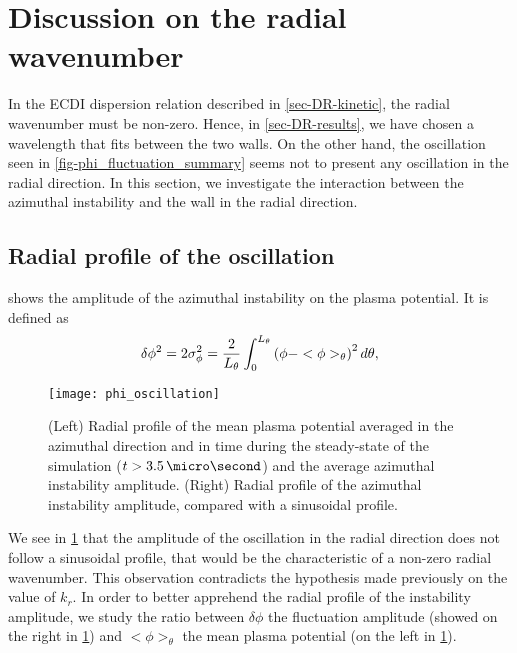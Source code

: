 
\section{ Discussion on the radial wavenumber}
  \label{sec-DR-BC}
    
  In the \ac{ECDI} dispersion relation described in \cref{sec-DR-kinetic}, the radial wavenumber must be non-zero.
  Hence, in \cref{sec-DR-results}, we have chosen a wavelength that fits between the two walls.
  On the other hand, the oscillation seen in \cref{fig-phi_fluctuation_summary} seems not to present any oscillation in the radial direction.
  In this section, we investigate the interaction between the azimuthal instability and the wall in the radial direction.
  
  \subsection{Radial profile of the oscillation} \label{subsec-radial_prof}
   shows the amplitude of the azimuthal instability on the plasma potential.
  It is defined as
  \begin{equation} \label{eq-stdphi}
    \delta \phi^2 = 2 \sigma_{\phi}^2 = \frac{{2}}{L_{\theta}} \int_0^{L_{\theta}} \left(  \phi - <\phi>_{\theta}  \right) ^2 d\theta,
  \end{equation}
  
  \begin{figure}[hbt]
    \centering
    \texttt{[image: phi\_oscillation]}
    \caption{(Left) Radial profile of the mean plasma potential averaged in the azimuthal direction  and in time during the steady-state of the simulation ($t > 3.5 \,\micro\second$) and the average azimuthal instability amplitude. (Right) Radial profile of the  azimuthal instability amplitude, compared with a sinusoidal profile. }
    \label{fig-phi_osci_profile}
  \end{figure}
  
  
  We see in \cref{fig-phi_osci_profile} that the amplitude of the oscillation in the radial direction does not follow a sinusoidal profile, that would be the characteristic of a non-zero radial wavenumber.
  This observation contradicts the hypothesis made previously on the value of $k_r$.
  In order to better apprehend the radial profile of the instability amplitude, we study the ratio between $\delta \phi$ the fluctuation amplitude (showed on the right in \cref{fig-phi_osci_profile}) and $<\phi>_{\theta}$  the mean plasma potential (on the left in \cref{fig-phi_osci_profile}).
  
